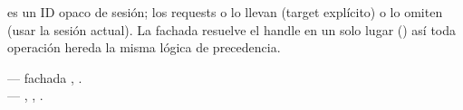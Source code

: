  es un ID opaco de sesión; los
requests o lo llevan (target explícito) o lo omiten (usar la
sesión actual). La fachada resuelve el handle en un solo lugar
() así toda operación hereda la
misma lógica de precedencia.

\begin{inthecode}
 --- fachada
, .\\
 ---
, , .
\end{inthecode}
